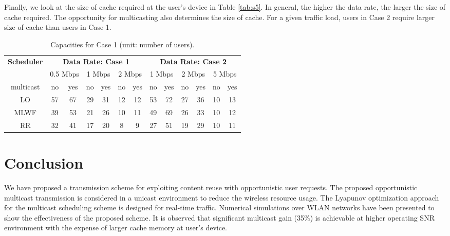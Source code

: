 \documentclass[conference]{IEEEtran}
\newcommand{\0}{\vect{0}}
\newcommand{\1}{\vect{1}}
\begin{document}
Finally, we look at the size of cache required at the user's device in Table \ref{tab:s5}. In general, the higher the data rate, the larger the size of cache required. The opportunity for multicasting also determines the size of cache. For a given traffic load, users in Case 2 require larger size of cache than users in Case 1.


\begin{table}[t]
\caption{Capacities for Case 1 (unit: number of users).}
\label{tab:s3}
\centering
\setlength{\tabcolsep}{.4em}
\resizebox{.48\textwidth }{!}
{
\begin{tabular}{|c|c c|c c|c c||c c|c c|c c|}
\hline
\multirow{2}{*}{\bfseries Scheduler} & \multicolumn{6}{c||}{\bfseries Data Rate: Case 1}&\multicolumn{6}{c|}{\bfseries Data Rate: Case 2} \\ \cline{2-13}
                           & \multicolumn{2}{c|}{0.5 Mbps}    & \multicolumn{2}{c|}{1 Mbps}   & \multicolumn{2}{c||}{2 Mbps}           & \multicolumn{2}{c|}{1 Mbps}    & \multicolumn{2}{c|}{2 Mbps}   & \multicolumn{2}{c|}{5 Mbps}          \\ \hline
multicast                  & no & yes      & no & yes  & no & yes        & no & yes      & no & yes  & no & yes        \\\hline\hline
LO                         & 57&67         & 29&31         & 12&12      & 53&72        & 27&36        & 10&13       \\ \hline
MLWF                       & 39&53         & 21&26         & 10&11     & 49&69        & 26&33        & 10&12       \\ \hline
RR                         & 32&41         & 17&20         &  8&9      & 27&51        & 19&29        & 10&11       \\ \hline
\end{tabular}
}
\end{table}







\section{Conclusion}\label{sec:con}

We have proposed a transmission scheme for exploiting content reuse with opportunistic user requests. The proposed opportunistic multicast transmission is considered in a unicast environment to reduce the wireless resource usage. The Lyapunov optimization approach for the multicast scheduling scheme is designed for real-time traffic. Numerical simulations over WLAN networks have been presented to show the effectiveness of the proposed scheme. It is observed that significant multicast gain (35$\%$) is achievable at higher operating SNR environment with the expense of larger cache memory at user's device.
\end{document}

